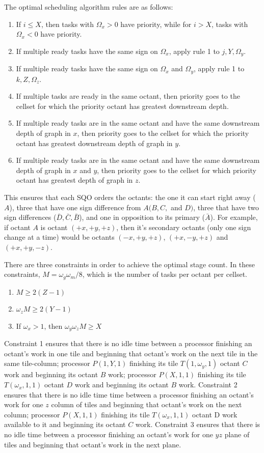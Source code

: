 \documentclass[11pt, letterpaper,titlepage,oneside]{article}
\begin{document}
The optimal scheduling algorithm rules are as follows:
\begin{enumerate}
\item If $i \leq X$, then tasks with $\Omega_x > 0$ have priority, while for $i > X$, tasks with $\Omega_x < 0$ have priority.
\item If multiple ready tasks have the same sign on $\Omega_x$, apply rule 1 to $j,Y,\Omega_y$.
\item If multiple ready tasks have the same sign on $\Omega_x$ and $\Omega_y$, apply rule 1 to $k,Z, \Omega_z$. 
\item If multiple tasks are ready in the same octant, then priority goes to the cellset for which the priority octant has greatest downstream depth.
\item If multiple ready tasks are in the same octant and have the same downstream depth of graph in $x$, then priority goes to the cellset for which the priority octant has greatest downstream depth of graph in $y$.
\item If multiple ready tasks are in the same octant and have the same downstream depth of graph in $x$ and $y$, then priority goes to the cellset for which priority octant has greatest depth of graph in $z$.
\end{enumerate}
This ensures that each SQO orders the octants: the one it can start right away ($A$), three that have one sign difference from $A (B,C,$ and $D)$, three that have two sign differences ($\bar D, \bar C, \bar B$), and one in opposition to its primary ($\bar A$). For example, if octant $A$ is octant $(+x, +y, +z)$, then it's secondary octants (only one sign change at a time) would be octants $(-x, +y, +z)$, $(+x,-y,+z)$ and $(+x,+y,-z)$.

There are three constraints in order to achieve the optimal stage count. In these constraints, $M = \omega_g \omega_m/8$, which is the number of tasks per octant per cellset.
\begin{enumerate}
\item $ M \geq 2(Z-1)$
\item $\omega_z M \geq 2(Y-1)$
\item If $\omega_x > 1$, then $\omega_y \omega_z M \geq X$
\end{enumerate}
Constraint 1 ensures that there is no idle time between a processor finishing an octant's work in one tile and beginning that octant's work on the next tile in the same tile-column; processor $P(1,Y,1)$ finishing its tile $T(1,\omega_y,1)$ octant $C$ work and beginning its octant $B$ work; processor $P(X,1,1)$ finishing its tile $T(\omega_x,1,1)$ octant $D$ work and beginning its octant $B$ work. Constraint 2 ensures that there is no idle time time between a processor finishing an octant's work for one $z$ column of tiles and beginning that octant's work on the next column; processor $P(X,1,1)$ finishing its tile $T(\omega_x,1,1)$ octant D work available to it and beginning its octant $C$ work. Constraint 3 ensures that there is no idle time between a processor finishing an octant's work for one $yz$ plane of tiles and beginning that octant's work in the next plane.
\end{document}
